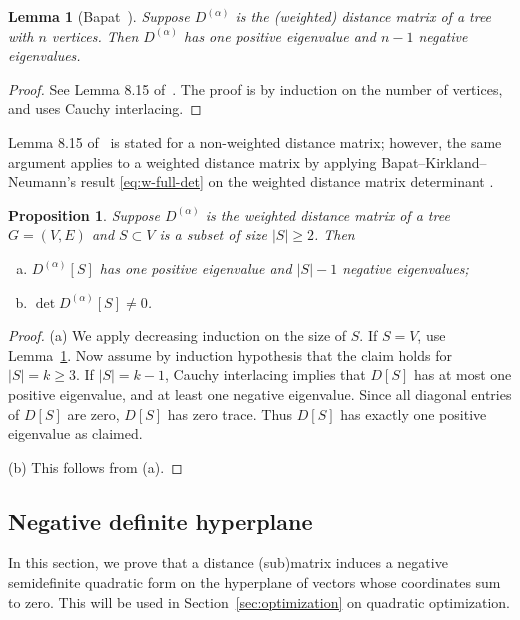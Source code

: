 \documentclass{amsart}
\newtheorem{prop}[thm]{Proposition}
\newtheorem{lem}[thm]{Lemma}
\theoremstyle{definition}
\newcommand{\Da}{{D^{(\alpha)}}}
\begin{document}
\begin{lem}[{Bapat~\cite[Lemma 8.15]{bapat}}]
\label{lem:dist-signature}
Suppose $\Da$ is the (weighted) distance matrix of a tree with $n$ vertices. 
Then $\Da$ has one positive eigenvalue and $n - 1$ negative eigenvalues.
\end{lem}
\begin{proof}
See Lemma 8.15 of~\cite{bapat}. The proof is by induction on the number of vertices, and uses Cauchy interlacing.
\end{proof}
Lemma 8.15 of~\cite{bapat} is stated for a non-weighted distance matrix;
however, the same argument applies to a weighted distance matrix by applying Bapat--Kirkland--Neumann's result \eqref{eq:w-full-det} on the weighted distance matrix determinant \cite[Corollary 2.5]{bapat-kirkland-neumann}. 

\begin{prop}
\label{prop:distance-sub-nonsingular}
Suppose $\Da$ is the weighted distance matrix of a tree $G = (V,E)$ and $S \subset V$ is a subset of size $|S| \geq 2$. 
Then
\begin{enumerate}[(a)]
\item $\Da[S]$ has one positive eigenvalue and $|S| - 1$ negative eigenvalues;

\item $\det \Da[S] \neq 0$.

\end{enumerate}
\end{prop}
\begin{proof}
(a) 
We apply decreasing induction on the size of $S$. 
If $S = V$, use Lemma~\ref{lem:dist-signature}.
Now assume by induction hypothesis that the claim holds for $|S| = k \geq 3$.
If $|S| = k - 1$, Cauchy interlacing implies that $D[S]$ has at most one positive eigenvalue, and at least one negative eigenvalue. 
Since all diagonal entries of $D[S]$ are zero, $D[S]$ has zero trace. 
Thus $D[S]$ has exactly one positive eigenvalue as claimed.

(b) This follows from (a).
\end{proof}

\subsection{Negative definite hyperplane}

In this section, we prove that a distance (sub)matrix induces a negative semidefinite quadratic form on the hyperplane of vectors whose coordinates sum to zero.
This will be used in Section~\ref{sec:optimization} on quadratic optimization.
\end{document}
